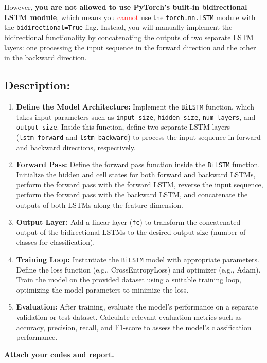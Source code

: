 \documentclass{article}
\begin{document}
However, \textbf{you are not allowed to use PyTorch's built-in bidirectional LSTM module},
which means you \textcolor{red}{cannot} use the \texttt{torch.nn.LSTM} module with the \texttt{bidirectional=True} flag. 
Instead, you will manually implement the bidirectional functionality 
by concatenating the outputs of two separate LSTM layers: 
one processing the input sequence in the forward direction and 
the other in the backward direction.

\subsection*{Description:}
\begin{enumerate}
    \item \textbf{Define the Model Architecture:} Implement the \texttt{BiLSTM} function, which takes input parameters such as \texttt{input\_size}, \texttt{hidden\_size}, \texttt{num\_layers}, and \texttt{output\_size}. Inside this function, define two separate LSTM layers (\texttt{lstm\_forward} and \texttt{lstm\_backward}) to process the input sequence in forward and backward directions, respectively.
    
    \item \textbf{Forward Pass:} Define the forward pass function inside the \texttt{BiLSTM} function. Initialize the hidden and cell states for both forward and backward LSTMs, perform the forward pass with the forward LSTM, reverse the input sequence, perform the forward pass with the backward LSTM, and concatenate the outputs of both LSTMs along the feature dimension.
    
    \item \textbf{Output Layer:} Add a linear layer (\texttt{fc}) to transform the concatenated output of the bidirectional LSTMs to the desired output size (number of classes for classification).
    
    \item \textbf{Training Loop:} Instantiate the \texttt{BiLSTM} model with appropriate parameters. Define the loss function (e.g., CrossEntropyLoss) and optimizer (e.g., Adam). Train the model on the provided dataset using a suitable training loop, optimizing the model parameters to minimize the loss.
    
    \item \textbf{Evaluation:} After training, evaluate the model's performance on a separate validation or test dataset. Calculate relevant evaluation metrics such as accuracy, precision, recall, and F1-score to assess the model's classification performance.
\end{enumerate}

\textbf{Attach your codes and report.}
\end{document}
